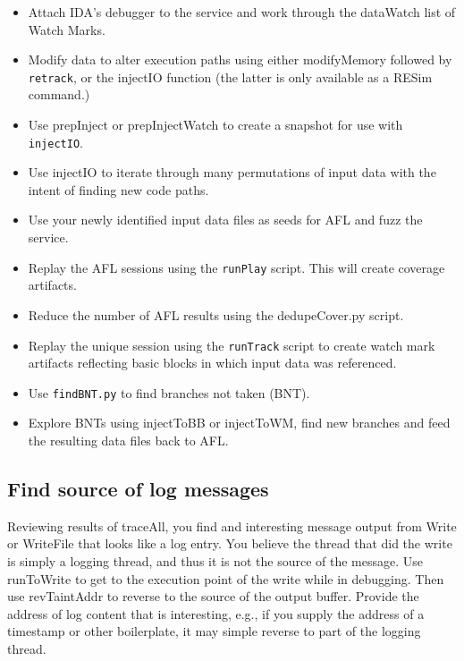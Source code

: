 \documentclass[titlepage]{article}
\begin{document}
\begin{itemize}
\item Attach IDA's debugger to the service and work through the dataWatch list of Watch Marks.

\item Modify data to alter execution paths using either modifyMemory followed by {\tt retrack}, or the injectIO function (the latter
is only available as a RESim command.)  

\item Use prepInject or prepInjectWatch to create a snapshot for use with {\tt injectIO}.

\item Use injectIO to iterate through many permutations of input data with the intent of finding new code paths.

\item Use your newly identified input data files as seeds for AFL and fuzz the service.

\item Replay the AFL sessions using the {\tt runPlay} script.  This will create coverage artifacts.

\item Reduce the number of AFL results using the dedupeCover.py script.

\item Replay the unique session using the {\tt runTrack} script to create watch mark artifacts reflecting
basic blocks in which input data was referenced.

\item Use {\tt findBNT.py} to find branches not taken (BNT).

\item Explore BNTs using injectToBB or injectToWM, find new branches and feed the resulting data files
back to AFL.

\end{itemize}

\subsection{Find source of log messages}
Reviewing results of traceAll, you find and interesting message output from Write or WriteFile that looks like a log entry.
You believe the thread that did the write is simply a logging thread, and thus it is not the
source of the message. Use runToWrite to get to the execution point of the write while in debugging.  Then use revTaintAddr 
to reverse to the source of the output buffer.  Provide the address of log content that
is interesting, e.g., if you supply the address of a timestamp or other boilerplate, it may simple reverse to part of the logging thread.
\end{document}

